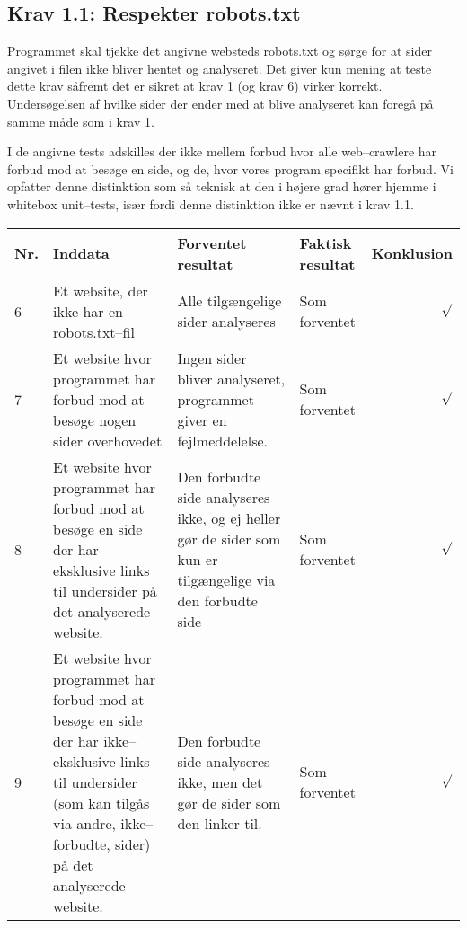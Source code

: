 \documentclass[a4paper,oneside,article]{memoir}
\begin{document}
\begin{landscape}

\subsection{Krav 1.1: Respekter robots.txt}

Programmet skal tjekke det angivne websteds robots.txt og sørge for at
sider angivet i filen ikke bliver hentet og analyseret. Det giver kun
mening at teste dette krav såfremt det er sikret at krav 1 (og krav 6)
virker korrekt. Undersøgelsen af hvilke sider der ender med at blive
analyseret kan foregå på samme måde som i krav 1.

I de angivne tests adskilles der ikke mellem forbud hvor alle
web--crawlere har forbud mod at besøge en side, og de, hvor vores
program specifikt har forbud. Vi opfatter denne distinktion som så
teknisk at den i højere grad hører hjemme i whitebox unit--tests, især
fordi denne distinktion ikke er nævnt i krav 1.1.

\begin{longtable}[c]{p{20pt}|p{220pt}|p{130pt}|p{130pt}|r}
\textbf{Nr.} &
\textbf{Inddata} &
\textbf{Forventet resultat} &
\textbf{Faktisk resultat} &
\textbf{Konklusion} \\ \hline

6 &
Et website, der ikke har en robots.txt--fil &
Alle tilgængelige sider analyseres &
Som forventet &
$\surd$ \\ \hline

7 &
Et website hvor programmet har forbud mod at besøge nogen sider
overhovedet &
Ingen sider bliver analyseret, programmet giver en fejlmeddelelse. &
Som forventet &
$\surd$ \\ \hline

8 &
Et website hvor programmet har forbud mod at besøge en side der har
eksklusive links til undersider på det analyserede website. &
Den forbudte side analyseres ikke, og ej heller gør de sider som kun
er tilgængelige via den forbudte side &
Som forventet &
$\surd$ \\ \hline

9 &
Et website hvor programmet har forbud mod at besøge en side der har
ikke--eksklusive links til undersider (som kan tilgås via andre,
ikke--forbudte, sider) på det analyserede website. &
Den forbudte side analyseres ikke, men det gør de sider som den linker
til. &
Som forventet &
$\surd$ \\ \hline

\end{longtable}


\end{landscape}
\end{document}
